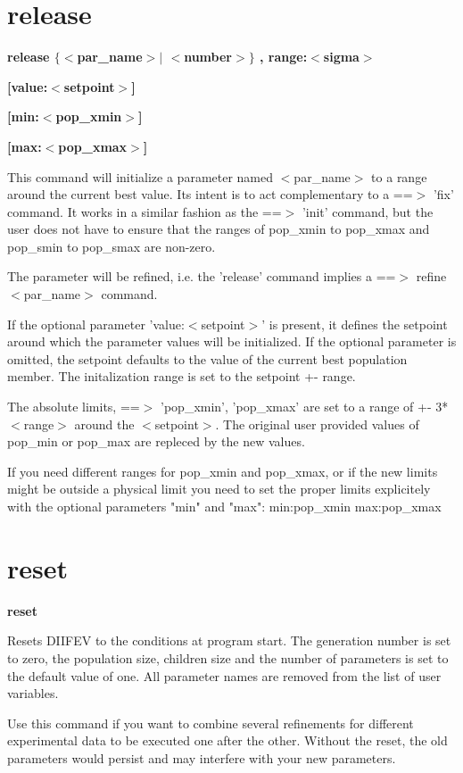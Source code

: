 \section{release}
{\bf release $ \{$$ <$par\_name$> $$| $ $ <$number$> $$\} $ , range:$ <$sigma$> $ \par }
{\bf   [value:$ <$setpoint$> $] \par }
{\bf   [min:$ <$pop\_xmin$> $] \par }
{\bf   [max:$ <$pop\_xmax$> $] \par }
\par
\vspace{3pt}
This command will initialize a parameter named $ <$par\_name$> $ 
to a range around the current best value. Its intent is 
to act complementary to a ==$> $ 'fix' command. It works 
in a similar fashion as the ==$> $ 'init' command, but the user 
does not have to ensure that the ranges of 
pop\_xmin to pop\_xmax and pop\_smin to pop\_smax are non-zero. 
\par
The parameter will be refined, i.e. the 'release' command 
implies a ==$> $ refine $ <$par\_name$> $ command. 
\par
If the optional parameter 'value:$ <$setpoint$> $' is present, 
it defines the setpoint around which the parameter values 
will be initialized. If the optional parameter is omitted, 
the setpoint defaults to the value of the current best 
population member. 
The initalization range is set to the setpoint +- range. 
\par
The absolute limits, ==$> $ 'pop\_xmin', 'pop\_xmax' are set 
to a range of +- 3* $ <$range$> $ around the $ <$setpoint$> $. 
The original user provided values of 
pop\_min or pop\_max are repleced by the new values. 
\par
If you need different ranges for pop\_xmin and pop\_xmax, 
or if the new limits might be 
outside a physical limit you need to set the proper 
limits explicitely with the optional parameters 
"min" and "max": 
   min:pop\_xmin 
   max:pop\_xmax 
\section{reset}
{\bf reset \par }
\par
\vspace{3pt}
Resets DIIFEV to the conditions at program start. The generation 
number is set to zero, the population size, children size and the 
number of parameters is set to the default value of one. All parameter 
names are removed from the list of user variables. 
\par
Use this command if you want to combine several refinements 
for different experimental data to be executed one after the other. 
Without the reset, the old parameters would persist and may 
interfere with your new parameters. 
